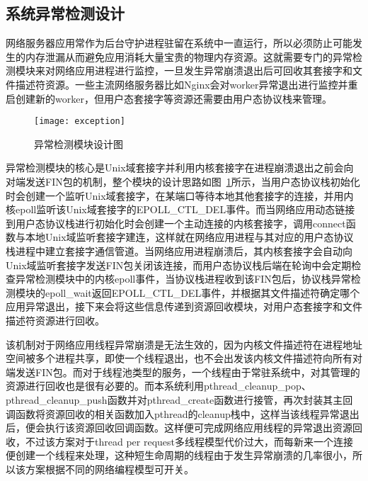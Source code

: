 \subsection{系统异常检测设计}

网络服务器应用常作为后台守护进程驻留在系统中一直运行，所以必须防止可能发生的内存泄漏从而避免应用消耗大量宝贵的物理内存资源。这就需要专门的异常检测模块来对网络应用进程进行监控，一旦发生异常崩溃退出后可回收其套接字和文件描述符资源。一些主流网络服务器比如Nginx会对worker异常退出进行监控并重启创建新的worker，但用户态套接字等资源还需要由用户态协议栈来管理。

\vspace{-10pt}
\begin{figure}[H] %
  \centering
  \texttt{[image: exception]}
  \caption{异常检测模块设计图}
  \label{fig:exception}
\end{figure}
\vspace{-10pt}

异常检测模块的核心是Unix域套接字并利用内核套接字在进程崩溃退出之前会向对端发送FIN包的机制，整个模块的设计思路如图~\ref{fig:exception}所示，当用户态协议栈初始化时会创建一个监听Unix域套接字，在某端口等待本地其他套接字的连接，并用内核epoll监听该Unix域套接字的EPOLL\_CTL\_DEL事件。而当网络应用动态链接到用户态协议栈进行初始化时会创建一个主动连接的内核套接字，调用connect函数与本地Unix域监听套接字建连，这样就在网络应用进程与其对应的用户态协议栈进程中建立套接字通信管道。当网络应用进程崩溃后，其内核套接字会自动向Unix域监听套接字发送FIN包关闭该连接，而用户态协议栈后端在轮询中会定期检查异常检测模块中的内核epoll事件，当协议栈进程收到该FIN包后，协议栈异常检测模块的epoll\_wait返回EPOLL\_CTL\_DEL事件，并根据其文件描述符确定哪个应用异常退出，接下来会将这些信息传递到资源回收模块，对用户态套接字和文件描述符资源进行回收。

该机制对于网络应用线程异常崩溃是无法生效的，因为内核文件描述符在进程地址空间被多个进程共享，即使一个线程退出，也不会出发该内核文件描述符向所有对端发送FIN包。而对于线程池类型的服务，一个线程由于常驻系统中，对其管理的资源进行回收也是很有必要的。而本系统利用pthread\_cleanup\_pop、pthread\_cleanup\_push函数并对pthread\_create函数进行接管，再次封装其主回调函数将资源回收的相关函数加入pthread的cleanup栈中，这样当该线程异常退出后，便会执行该资源回收回调函数。这样便可完成网络应用线程的异常退出资源回收，不过该方案对于thread per request多线程模型代价过大，而每新来一个连接便创建一个线程来处理，这种短生命周期的线程由于发生异常崩溃的几率很小，所以该方案根据不同的网络编程模型可开关。